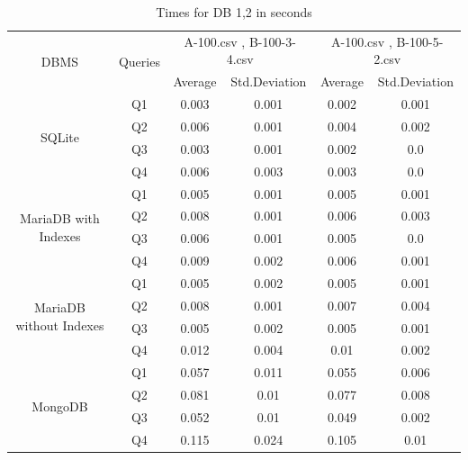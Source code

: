 \documentclass[12pt]{article}
\begin{document}

\begin{table}[H]
    \centering
\begin{tabular}{|c|c|c|c|c|c|}
    \hline
    \multirow{2}{*}{DBMS} & \multirow{2}{*}{Queries} & \multicolumn{2}{c|}{A-100.csv ,  B-100-3-4.csv} & \multicolumn{2}{c|}{A-100.csv ,  B-100-5-2.csv }\\
    \cline{3-6}
     & & Average & Std.Deviation & Average & Std.Deviation\\
    \hline
     \multirow{4}{*}{SQLite}& Q1 & 0.003 & 0.001 & 0.002 & 0.001 \\
\cline{2-6}
& Q2 & 0.006 & 0.001 & 0.004 & 0.002 \\
\cline{2-6}
& Q3 & 0.003 & 0.001 & 0.002 & 0.0 \\
\cline{2-6}
& Q4 & 0.006 & 0.003 & 0.003 & 0.0 \\
     \cline{2-6}
     \hline
     \multirow{4}{*}{MariaDB with Indexes} 
& Q1 & 0.005 & 0.001 & 0.005 & 0.001 \\
\cline{2-6}
& Q2 & 0.008 & 0.001 & 0.006 & 0.003 \\
\cline{2-6}
& Q3 & 0.006 & 0.001 & 0.005 & 0.0 \\
\cline{2-6}
& Q4 & 0.009 & 0.002 & 0.006 & 0.001 \\
     \cline{2-6}
    \hline
    \multirow{4}{*}{MariaDB without Indexes} 
& Q1 & 0.005 & 0.002 & 0.005 & 0.001 \\
\cline{2-6}
& Q2 & 0.008 & 0.001 & 0.007 & 0.004 \\
\cline{2-6}
& Q3 & 0.005 & 0.002 & 0.005 & 0.001 \\
\cline{2-6}
& Q4 & 0.012 & 0.004 & 0.01 & 0.002 \\
     \cline{2-6}
    \hline
    \multirow{4}{*}{MongoDB} 
& Q1 & 0.057 & 0.011 & 0.055 & 0.006 \\
\cline{2-6}
& Q2 & 0.081 & 0.01 & 0.077 & 0.008 \\
\cline{2-6}
& Q3 & 0.052 & 0.01 & 0.049 & 0.002 \\
\cline{2-6}
& Q4 & 0.115 & 0.024 & 0.105 & 0.01 \\

     \cline{2-6}
    \hline
\end{tabular}

    \caption{Times for DB 1,2 in seconds}
    \label{tab:my_label}
\end{table}
\end{document}
